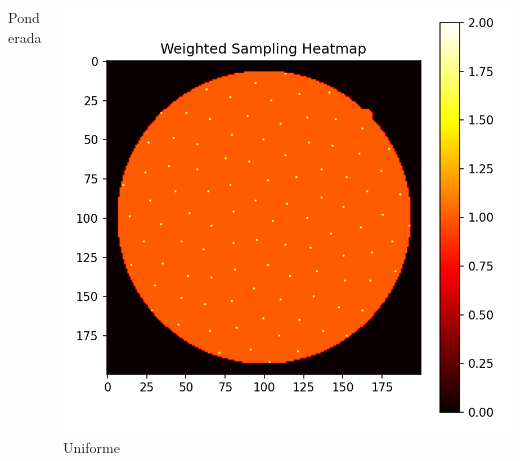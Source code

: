 \documentclass[xcolor=dvipsnames]{beamer}
\begin{document}
\begin{frame}
\begin{columns}[T]
\begin{column}{0.3\textwidth}
            \small{Ponderada}
        \end{column}
        \begin{column}{0.3\textwidth}
            \centering            
            \includegraphics[width=\textwidth]{../imaxes/muestraje/uniform_sampling_heatmap.png}
            \small{Uniforme}
        \end{column}
    \end{columns}
    \centering
\end{frame}
\end{document}
